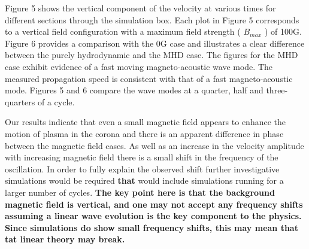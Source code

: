 \documentclass[physics,article,submit,pdftex,moreauthors]{Definitions/mdpi}
\begin{document}








 Figure 5 %
 shows the vertical component of the velocity at various times for different sections through the simulation box. Each plot in  Figure 5 %
 corresponds to a vertical field configuration with a maximum field strength ( $ B_{max} $ ) of 100G. Figure 6 provides a comparison with the 0G case and %
 illustrates a clear difference between the purely hydrodynamic and the MHD case. The figures for the MHD case exhibit evidence of a fast moving magneto-acoustic wave mode. The measured propagation speed is consistent with that of a fast magneto-acoustic mode. Figures 5 and 6 compare the wave modes at a quarter, half and three-quarters of a cycle. 
  
  
  Our results indicate that even a small magnetic field appears to enhance the motion of plasma in the corona and  there is an apparent difference in phase between the magnetic field cases. As well as an increase in the velocity amplitude with increasing magnetic field there is a small shift in the frequency of the oscillation. In order to fully explain the observed shift further investigative simulations would be required {\bf that} would include simulations running for a larger number of cycles. {\bf The key point here is that the background magnetic field is vertical, and one may not accept any frequency shifts assuming a linear wave evolution is the key component to the physics. Since simulations do show small frequency shifts, this may mean that tat linear theory may break.}
  
\end{document}
